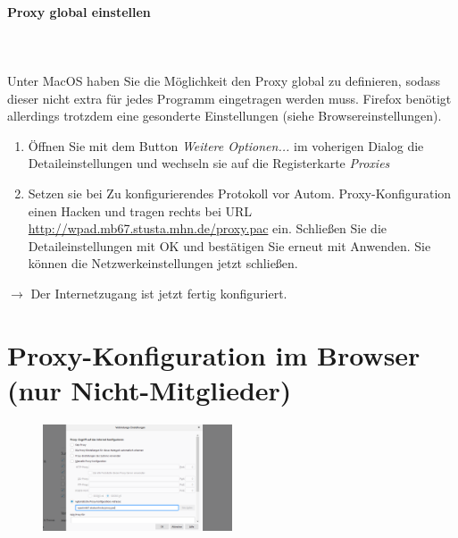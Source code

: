 \documentclass[a4paper,12pt]{scrartcl}
\begin{document}
\paragraph*{Proxy global einstellen}~\\
\\
Unter MacOS haben Sie die Möglichkeit den Proxy global zu definieren, sodass dieser nicht extra für jedes Programm eingetragen werden muss. Firefox benötigt allerdings trotzdem eine gesonderte Einstellungen (siehe Browsereinstellungen). %

\begin{enumerate}%
    \item Öffnen Sie mit dem Button \emph{Weitere Optionen...} im voherigen Dialog die Detaileinstellungen und wechseln sie auf die Registerkarte \emph{Proxies}
    \item Setzen sie bei Zu konfigurierendes Protokoll vor Autom. Proxy-Konfiguration einen Hacken und tragen rechts bei URL \url{http://wpad.mb67.stusta.mhn.de/proxy.pac} ein. Schließen Sie die Detaileinstellungen mit OK und bestätigen Sie erneut mit Anwenden. Sie können die Netzwerkeinstellungen jetzt schließen.
\end{enumerate}
$\rightarrow$ Der Internetzugang ist jetzt fertig konfiguriert.

\newpage

\section*{Proxy-Konfiguration im Browser (nur Nicht-Mitglieder)}
\label{Proxy}

\begin{figure}
	\vspace{-40pt}
	\begin{center}
		\includegraphics[width=0.5\textwidth,keepaspectratio]{Bilder/Firefox_proxy_mb_neu}
	\end{center}
\end{figure}
\end{document}
